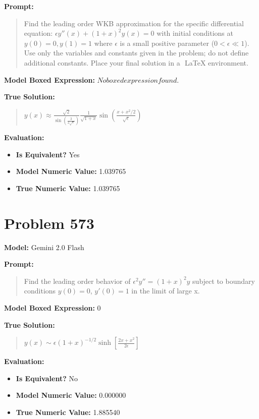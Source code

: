 \documentclass{article}
\begin{document}
\textbf{Prompt:}
\begin{quote}
Find the leading order WKB approximation for the specific differential equation: $\epsilon y''(x) + (1+x)^2 y(x) = 0$ with initial conditions at $ y(0) = 0, y(1) = 1$ where $\epsilon$ is a small positive parameter ($0 < \epsilon \ll 1$). Use only the variables and constants given in the problem; do not define additional constants. Place your final solution in a $\boxed{}$ LaTeX environment.
\end{quote}
\textbf{Model Boxed Expression:} $No boxed expression found.$

\textbf{True Solution:}
\begin{quote}
$y(x) \approx \frac{\sqrt{2}}{\sin\left(\frac{3}{2\sqrt{\epsilon}}\right)} \frac{1}{\sqrt{1+x}} \sin\left(\frac{x + x^2/2}{\sqrt{\epsilon}}\right)$
\end{quote}

\textbf{Evaluation:}
\begin{itemize}
\item \textbf{Is Equivalent?} Yes
\item \textbf{Model Numeric Value:} 1.039765
\item \textbf{True Numeric Value:} 1.039765
\end{itemize}
\vspace{1cm}
\section*{Problem 573}
\textbf{Model:} Gemini 2.0 Flash

\textbf{Prompt:}
\begin{quote}
Find the leading order behavior of $\epsilon^2 y'' = (1+x)^2 y$ subject to boundary conditions $y(0) = 0$, $y'(0)= 1$ in the limit of large x.
\end{quote}
\textbf{Model Boxed Expression:} $0$

\textbf{True Solution:}
\begin{quote}
$y(x) \sim \epsilon (1+x)^{-1/2}\sinh[\frac{2x+x^2}{2\epsilon}]$
\end{quote}

\textbf{Evaluation:}
\begin{itemize}
\item \textbf{Is Equivalent?} No
\item \textbf{Model Numeric Value:} 0.000000
\item \textbf{True Numeric Value:} 1.885540
\end{itemize}
\vspace{1cm}
\end{document}

